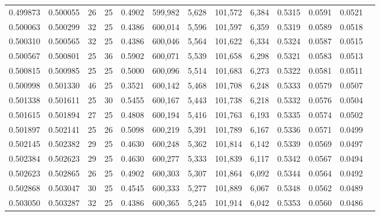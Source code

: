 \begin{tabular}{rrrrrrrrrrrrr}
0.499873 & 0.500055 &    26 &  25 &                                     0.4902 & 599,982 &   5,628 & 101,572 &   6,384 & 0.5315 & 0.0591 & 0.0521 \\
0.500063 & 0.500299 &    32 &  25 &                                     0.4386 & 600,014 &   5,596 & 101,597 &   6,359 & 0.5319 & 0.0589 & 0.0518 \\
0.500310 & 0.500565 &    32 &  25 &                                     0.4386 & 600,046 &   5,564 & 101,622 &   6,334 & 0.5324 & 0.0587 & 0.0515 \\
0.500567 & 0.500801 &    25 &  36 &                                     0.5902 & 600,071 &   5,539 & 101,658 &   6,298 & 0.5321 & 0.0583 & 0.0513 \\
0.500815 & 0.500985 &    25 &  25 &                                     0.5000 & 600,096 &   5,514 & 101,683 &   6,273 & 0.5322 & 0.0581 & 0.0511 \\
0.500998 & 0.501330 &    46 &  25 &                                     0.3521 & 600,142 &   5,468 & 101,708 &   6,248 & 0.5333 & 0.0579 & 0.0507 \\
0.501338 & 0.501611 &    25 &  30 &                                     0.5455 & 600,167 &   5,443 & 101,738 &   6,218 & 0.5332 & 0.0576 & 0.0504 \\
0.501615 & 0.501894 &    27 &  25 &                                     0.4808 & 600,194 &   5,416 & 101,763 &   6,193 & 0.5335 & 0.0574 & 0.0502 \\
0.501897 & 0.502141 &    25 &  26 &                                     0.5098 & 600,219 &   5,391 & 101,789 &   6,167 & 0.5336 & 0.0571 & 0.0499 \\
0.502145 & 0.502382 &    29 &  25 &                                     0.4630 & 600,248 &   5,362 & 101,814 &   6,142 & 0.5339 & 0.0569 & 0.0497 \\
0.502384 & 0.502623 &    29 &  25 &                                     0.4630 & 600,277 &   5,333 & 101,839 &   6,117 & 0.5342 & 0.0567 & 0.0494 \\
0.502623 & 0.502865 &    26 &  25 &                                     0.4902 & 600,303 &   5,307 & 101,864 &   6,092 & 0.5344 & 0.0564 & 0.0492 \\
0.502868 & 0.503047 &    30 &  25 &                                     0.4545 & 600,333 &   5,277 & 101,889 &   6,067 & 0.5348 & 0.0562 & 0.0489 \\
0.503050 & 0.503287 &    32 &  25 &                                     0.4386 & 600,365 &   5,245 & 101,914 &   6,042 & 0.5353 & 0.0560 & 0.0486 \\

\end{tabular}
